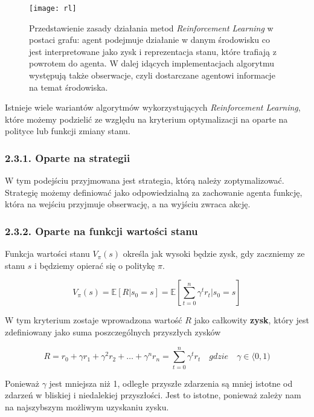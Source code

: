 \documentclass{article}
\begin{document}
\begin{figure}[h]
\centering
\texttt{[image: rl]}
\caption{Przedstawienie zasady działania metod \emph{Reinforcement Learning} w postaci grafu: agent podejmuje działanie w danym środowisku co jest interpretowane jako zysk i reprezentacja stanu, które trafiają z powrotem do agenta. W dalej idących implementacjach algorytmu występują także obserwacje, czyli dostarczane agentowi informacje na temat środowiska.}
\end{figure}

Istnieje wiele wariantów algorytmów wykorzystujących \emph{Reinforcement Learning}, które możemy podzielić ze względu na kryterium optymalizacji na oparte na polityce lub funkcji zmiany stanu.

\subsubsection*{\Large{2.3.1. Oparte na strategii}}
W tym podejściu przyjmowana jest strategia, którą należy zoptymalizować. Strategię możemy definiować jako odpowiedzialną za zachowanie agenta funkcję, która na wejściu przyjmuje obserwację, a na wyjściu zwraca akcję.  

\subsubsection*{\Large{2.3.2. Oparte na funkcji wartości stanu}}
Funkcja wartości stanu $V_{\pi}(s)$ określa jak wysoki będzie zysk, gdy zaczniemy ze stanu $s$ i będziemy opierać się o politykę $\pi$. 

\[V_{\pi}(s) = \mathbb{E}[R | s_0=s] = \mathbb{E} \left[\sum_{t=0}^n \gamma^t r_t | s_0=s \right]\]

W tym kryterium zostaje wprowadzona wartość $R$ jako całkowity \textbf{zysk}, który jest zdefiniowany jako suma poszczególnych przyszłych zysków

\[R = r_{0} + \gamma r_1 + \gamma^2 r_2 + \ldots + \gamma^n r_n = \sum_{t=0}^n \gamma^t r_t \quad gdzie \quad \gamma \in \langle 0, 1)\]

Ponieważ $\gamma$ jest mniejsza niż 1, odległe przyszłe zdarzenia są mniej istotne od zdarzeń w bliskiej i niedalekiej przyszłości. Jest to istotne, ponieważ zależy nam na najszybszym możliwym uzyskaniu zysku.
\end{document}
